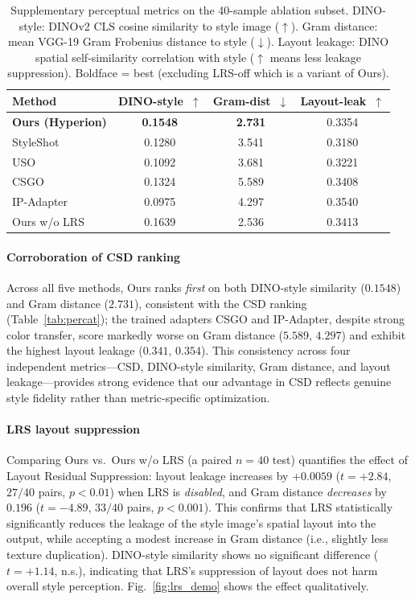 \begin{table}[h]
  \centering
  \caption{%
    Supplementary perceptual metrics on the 40-sample ablation subset.
    DINO-style: DINOv2 CLS cosine similarity to style image ($\uparrow$).
    Gram distance: mean VGG-19 Gram Frobenius distance to style ($\downarrow$).
    Layout leakage: DINO spatial self-similarity correlation with style ($\uparrow$ means less leakage suppression).
    Boldface = best (excluding LRS-off which is a variant of Ours).%
  }
  \label{tab:supp_metrics}
  \footnotesize
  \begin{tabular}{lccc}
    \toprule
    Method & DINO-style~$\uparrow$ & Gram-dist~$\downarrow$ & Layout-leak~$\uparrow$ \\
    \midrule
    \textbf{Ours (Hyperion)} & \textbf{0.1548} & \textbf{2.731} & 0.3354 \\
    StyleShot               & 0.1280 & 3.541 & 0.3180 \\
    USO                     & 0.1092 & 3.681 & 0.3221 \\
    CSGO                    & 0.1324 & 5.589 & 0.3408 \\
    IP-Adapter              & 0.0975 & 4.297 & 0.3540 \\
    \midrule
    Ours w/o LRS            & 0.1639 & 2.536 & 0.3413 \\
    \bottomrule
  \end{tabular}
\end{table}

\paragraph{Corroboration of CSD ranking}
Across all five methods, Ours ranks \emph{first} on both DINO-style similarity
($0.1548$) and Gram distance ($2.731$), consistent with the CSD ranking
(Table~\ref{tab:percat}); the trained adapters CSGO and IP-Adapter, despite
strong color transfer, score markedly worse on Gram distance ($5.589$, $4.297$)
and exhibit the highest layout leakage ($0.341$, $0.354$).
This consistency across four independent metrics---CSD, DINO-style similarity, Gram distance, and layout leakage---provides strong evidence that our advantage in CSD reflects genuine style fidelity rather than metric-specific optimization.

\paragraph{LRS layout suppression}
Comparing Ours vs.\ Ours w/o LRS (a paired $n{=}40$ test) quantifies the effect of Layout Residual Suppression:
layout leakage increases by $+0.0059$ ($t = +2.84$, $27/40$ pairs, $p < 0.01$) when LRS is \emph{disabled},
and Gram distance \emph{decreases} by $0.196$ ($t = -4.89$, $33/40$ pairs, $p < 0.001$).
This confirms that LRS statistically significantly reduces the leakage of the style image's spatial layout into the output, while accepting a modest increase in Gram distance (i.e., slightly less texture duplication).
DINO-style similarity shows no significant difference ($t = +1.14$, n.s.),
indicating that LRS's suppression of layout does not harm overall style perception.
Fig.~\ref{fig:lrs_demo} shows the effect qualitatively.

